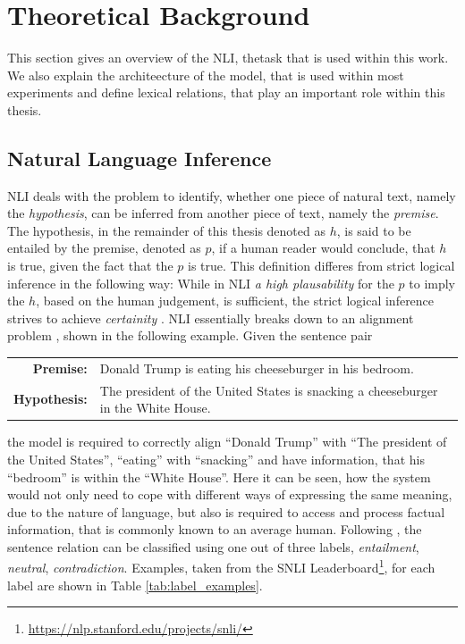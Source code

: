 \section{Theoretical Background}\label{sec:basics}
This section gives an overview of the \ac{NLI}, thetask that is used within this work. We also explain the architeecture of the model, that is used within most experiments and define lexical relations, that play an important role within this thesis.
\subsection{Natural Language Inference}\label{sec:basics_nli}
\ac{NLI} \citep{bowman2015large} deals with the problem to identify, whether one piece of natural text, namely the \textit{hypothesis}, can be inferred from another piece of text, namely the \textit{premise}. The hypothesis, in the remainder of this thesis denoted as $h$, is said to be entailed by the premise, denoted as $p$, if a human reader would conclude, that $h$ is true, given the fact that the $p$ is true. This definition differes from strict logical inference in the following way: While in \ac{NLI} \textit{a high plausability} for the $p$ to imply the $h$, based on the human judgement, is sufficient, the strict logical inference strives to achieve \textit{certainity} \citep{dagan2009recognizing}. \ac{NLI} essentially breaks down to an alignment problem \citep{maccartney2008phrase}, shown in the following example. Given the sentence pair
\begin{center}
\begin{tabular}{rl}
\textbf{Premise:} & Donald Trump is eating his cheeseburger in his bedroom. \\
\textbf{Hypothesis:} & The president of the United States is snacking a cheeseburger in the White House. 
\end{tabular}
\end{center}
the model is required to correctly align ``Donald Trump'' with ``The president of the United States'', ``eating'' with ``snacking'' and have information, that his ``bedroom'' is within the ``White House''. Here it can be seen, how the system would not only need to cope with different ways of expressing the same meaning, due to the nature of language, but also is required to access and process factual information, that is commonly known to an average human. Following \cite{bowman2015large}, the sentence relation can be classified using one out of three labels, \textit{entailment}, \textit{neutral}, \textit{contradiction}. Examples, taken from the SNLI Leaderboard\footnote{\href{https://nlp.stanford.edu/projects/snli/}{https://nlp.stanford.edu/projects/snli/}}, for each label are shown in Table \ref{tab:label_examples}.
